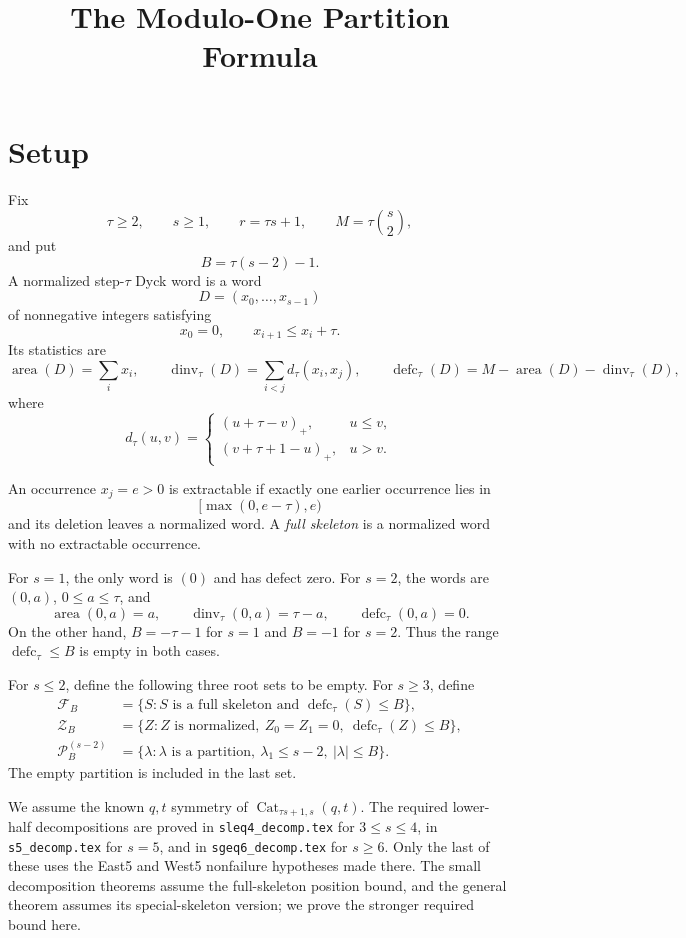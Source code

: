 \documentclass[11pt]{article}
\title{The Modulo-One Partition Formula}
\author{}
\date{}
\theoremstyle{definition}
\theoremstyle{remark}
\newcommand{\area}{\operatorname{area}}
\newcommand{\dinv}{\operatorname{dinv}}
\newcommand{\defc}{\operatorname{defc}}
\newcommand{\Cat}{\operatorname{Cat}}
\begin{document}
\maketitle

\section{Setup}

Fix
\[
  \tau\ge2,\qquad s\ge1,\qquad r=\tau s+1,
  \qquad M=\tau\binom{s}{2},
\]
and put
\[
  B=\tau(s-2)-1.
\]
A normalized step-$\tau$ Dyck word is a word
\[
  D=(x_0,\ldots,x_{s-1})
\]
of nonnegative integers satisfying
\[
  x_0=0,
  \qquad x_{i+1}\le x_i+\tau.
\]
Its statistics are
\[
 \area(D)=\sum_i x_i,
 \qquad
 \dinv_\tau(D)=\sum_{i<j}d_\tau(x_i,x_j),
 \qquad
 \defc_\tau(D)=M-\area(D)-\dinv_\tau(D),
\]
where
\[
 d_\tau(u,v)=
 \begin{cases}
   (u+\tau-v)_+,&u\le v,\\
   (v+\tau+1-u)_+,&u>v.
 \end{cases}
\]

An occurrence $x_j=e>0$ is extractable if exactly one earlier occurrence
lies in
\[
  [\max(0,e-\tau),e)
\]
and its deletion leaves a normalized word.  A \emph{full skeleton} is a
normalized word with no extractable occurrence.

For $s=1$, the only word is $(0)$ and has defect zero.  For $s=2$, the
words are $(0,a)$, $0\le a\le\tau$, and
\[
 \area(0,a)=a,\qquad \dinv_\tau(0,a)=\tau-a,\qquad
 \defc_\tau(0,a)=0.
\]
On the other hand, $B=-\tau-1$ for $s=1$ and $B=-1$ for $s=2$.
Thus the range $\defc_\tau\le B$ is empty in both cases.

For $s\le2$, define the following three root sets to be empty.  For
$s\ge3$, define
\begin{align*}
 \mathcal F_B
   &=\{S:S\text{ is a full skeleton and }\defc_\tau(S)\le B\},\\
 \mathcal Z_B
   &=\{Z:Z\text{ is normalized},\ Z_0=Z_1=0,
                    \ \defc_\tau(Z)\le B\},\\
 \mathcal P_B^{(s-2)}
   &=\{\lambda:\lambda\text{ is a partition},\
          \lambda_1\le s-2,\ |\lambda|\le B\}.
\end{align*}
The empty partition is included in the last set.

We assume the known $q,t$ symmetry of
$\Cat_{\tau s+1,s}(q,t)$.  The required lower-half decompositions are
proved in \texttt{sleq4\_decomp.tex} for $3\le s\le4$, in
\texttt{s5\_decomp.tex} for $s=5$, and in \texttt{sgeq6\_decomp.tex} for
$s\ge6$.  Only the last of these uses the East5 and West5 nonfailure
hypotheses made there.  The small decomposition theorems assume the
full-skeleton position bound, and the general theorem assumes its
special-skeleton version; we prove the stronger required bound here.
\end{document}
